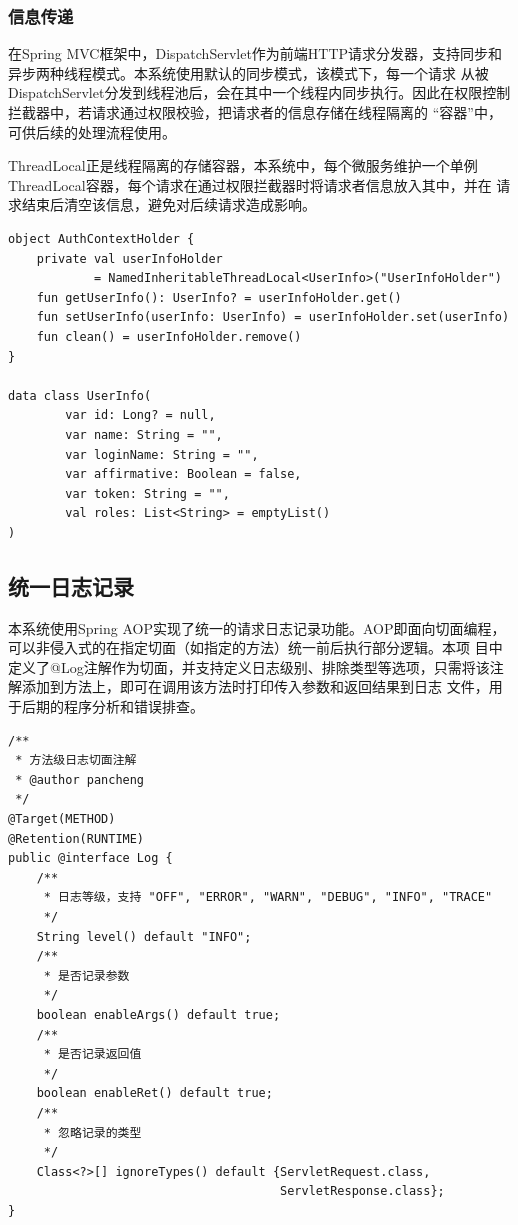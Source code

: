 \documentclass[titlepage,UTF8,linespread=1.5]{ctexart}
\begin{document}
\subsubsection{信息传递}
在Spring MVC框架中，DispatchServlet作为前端HTTP请求分发器，支持同步和异步两种线程模式。本系统使用默认的同步模式，该模式下，每一个请求
从被DispatchServlet分发到线程池后，会在其中一个线程内同步执行。因此在权限控制拦截器中，若请求通过权限校验，把请求者的信息存储在线程隔离的
“容器”中，可供后续的处理流程使用。\par
ThreadLocal正是线程隔离的存储容器，本系统中，每个微服务维护一个单例ThreadLocal容器，每个请求在通过权限拦截器时将请求者信息放入其中，并在
请求结束后清空该信息，避免对后续请求造成影响。\par
\begin{mdframed}\begin{verbatim}
object AuthContextHolder {
    private val userInfoHolder 
            = NamedInheritableThreadLocal<UserInfo>("UserInfoHolder")
    fun getUserInfo(): UserInfo? = userInfoHolder.get()
    fun setUserInfo(userInfo: UserInfo) = userInfoHolder.set(userInfo)
    fun clean() = userInfoHolder.remove()
}

data class UserInfo(
        var id: Long? = null,
        var name: String = "",
        var loginName: String = "",
        var affirmative: Boolean = false,
        var token: String = "",
        val roles: List<String> = emptyList()
)
\end{verbatim}\end{mdframed}\par

\subsection{统一日志记录}
本系统使用Spring AOP实现了统一的请求日志记录功能。AOP即面向切面编程，可以非侵入式的在指定切面（如指定的方法）统一前后执行部分逻辑。本项
目中定义了@Log注解作为切面，并支持定义日志级别、排除类型等选项，只需将该注解添加到方法上，即可在调用该方法时打印传入参数和返回结果到日志
文件，用于后期的程序分析和错误排查。
\begin{mdframed}\begin{verbatim}
/**
 * 方法级日志切面注解
 * @author pancheng
 */
@Target(METHOD)
@Retention(RUNTIME)
public @interface Log {
    /**
     * 日志等级，支持 "OFF", "ERROR", "WARN", "DEBUG", "INFO", "TRACE"
     */
    String level() default "INFO";
    /**
     * 是否记录参数
     */
    boolean enableArgs() default true;   
    /**
     * 是否记录返回值
     */
    boolean enableRet() default true;
    /**
     * 忽略记录的类型
     */
    Class<?>[] ignoreTypes() default {ServletRequest.class, 
                                      ServletResponse.class};
}
\end{verbatim}\end{mdframed}\par
\end{document}
